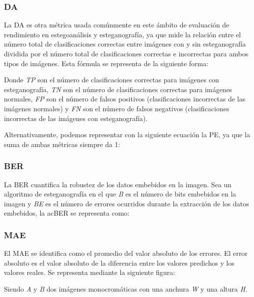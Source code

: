\subsubsection{DA}

La \ac{DA} es otra métrica usada comúnmente en este ámbito de evaluación de rendimiento en estegoanálisis y esteganografía, ya que mide la relación entre el número total de clasificaciones correctas entre imágenes con y sin esteganografía dividida por el número total de clasificaciones correctas e incorrectas para ambos tipos de imágenes. Esta fórmula se representa de la siguiente forma:


Donde \textit{TP} son el número de clasificaciones correctas para imágenes con esteganografía, \textit{TN} son el número de clasificaciones correctas para imágenes normales, \textit{FP} son el número de falsos positivos (clasificaciones incorrectas de las imágenes normales) y \textit{FN} son el número de falsos negativos (clasificaciones incorrectas de las imágenes con esteganografía).

Alternativamente, podemos representar con la siguiente ecuación la \ac{PE}, ya que la suma de ambas métricas siempre da 1:


\subsubsection{BER}

La \ac{BER} cuantifica la robustez de los datos embebidos en la imagen. Sea un algoritmo de esteganografía en el que \textit{B} es el número de bits embebidos en la imagen y \textit{BE} es el número de errores ocurridos durante la extracción de los datos embebidos, la ac{BER} se representa como:


\subsubsection{MAE}

El \ac{MAE} se identifica como el promedio del valor absoluto de los errores. El error absoluto es el valor absoluto de la diferencia entre los valores predichos y los valores reales. Se representa mediante la siguiente figura:


Siendo \textit{A} y \textit{B} dos imágenes monocromáticas con una anchura \textit{W} y una altura \textit{H}.

